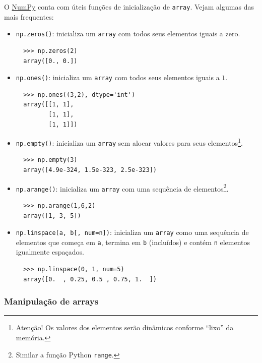 \documentclass[12pt]{article}
\begin{document}
O \href{https://numpy.org/}{NumPy} conta com úteis funções de inicialização de \lstinline+array+. Vejam algumas das mais frequentes:
\begin{itemize}
\item \lstinline+np.zeros()+: inicializa um \lstinline+array+ com todos seus elementos iguais a zero.
  \begin{lstlisting}
  >>> np.zeros(2)
  array([0., 0.])
  \end{lstlisting}
\item \lstinline+np.ones()+: inicializa um \lstinline+array+ com todos seus elementos iguais a $1$.
  \begin{lstlisting}
  >>> np.ones((3,2), dtype='int')
  array([[1, 1],
         [1, 1],
         [1, 1]])
  \end{lstlisting}
\item \lstinline+np.empty()+: inicializa um \lstinline+array+ sem alocar valores para seus elementos\footnote{Atenção! Os valores dos elementos serão dinâmicos conforme ``lixo'' da memória.}.
  \begin{lstlisting}
  >>> np.empty(3)
  array([4.9e-324, 1.5e-323, 2.5e-323])
  \end{lstlisting}
\item \lstinline+np.arange()+: inicializa um \lstinline+array+ com uma sequência de elementos\footnote{Similar a função Python \lstinline+range+.}.
  \begin{lstlisting}
  >>> np.arange(1,6,2)
  array([1, 3, 5])
  \end{lstlisting}
\item \lstinline+np.linspace(a, b[, num=n])+: inicializa um \lstinline+array+ como uma sequência de elementos que começa em \lstinline+a+, termina em \lstinline+b+ (incluídos) e contém \lstinline+n+ elementos igualmente espaçados.
  \begin{lstlisting}
  >>> np.linspace(0, 1, num=5)
  array([0.  , 0.25, 0.5 , 0.75, 1.  ])
  \end{lstlisting}
\end{itemize}

\subsubsection{Manipulação de arrays}
\end{document}
